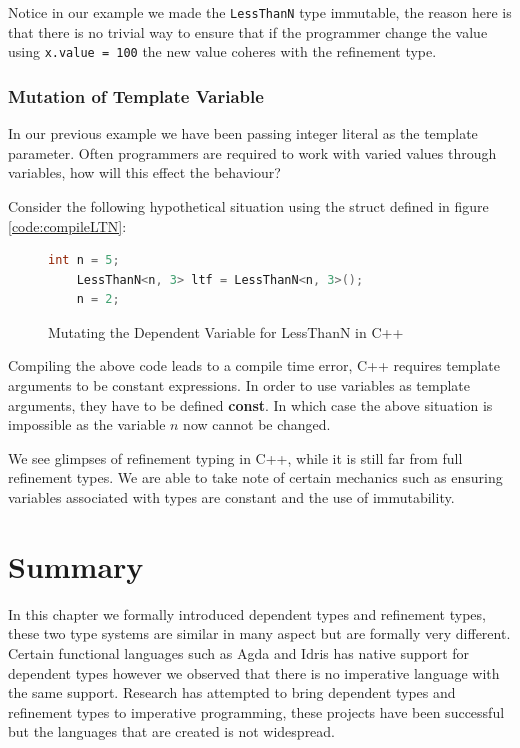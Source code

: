 \documentclass[a4paper,12pt]{report}
\begin{document}
\par
Notice in our example we made the \verb|LessThanN| type immutable, the reason 
here is that there is no trivial way to ensure that if the programmer change the 
value using \verb|x.value = 100| the new value coheres with the refinement 
type.

\subsubsection{Mutation of Template Variable}
In our previous example we have been passing integer literal as the template 
parameter. Often programmers are required to 
work with varied values through variables, how will this effect the behaviour? 

\par
Consider the following hypothetical situation using the struct defined in 
figure \ref{code:compileLTN}: 

\begin{figure}[H]
  \begin{lstlisting}[language=c++]     
    int n = 5;
    LessThanN<n, 3> ltf = LessThanN<n, 3>();
    n = 2;
  \end{lstlisting}
  \caption{Mutating the Dependent Variable for LessThanN in C++}
\end{figure}

\par
Compiling the above code leads to a compile time error, C++ requires template 
arguments to be constant expressions. In order to use variables as template 
arguments, they have to be defined \textbf{const}. In which case the above 
situation is impossible as the variable $n$ now cannot be changed. 

\par
We see glimpses of refinement typing in C++, while it is still far from full 
refinement types. We are able to take note of certain mechanics such as ensuring 
variables associated with types are constant and the use of immutability. 

\section{Summary}
In this chapter we formally introduced dependent types and refinement types, 
these two type systems are similar in many aspect but are formally very 
different. Certain functional languages such as Agda and Idris has native support for 
dependent types however we observed that there is no imperative language with 
the same support. Research has attempted to bring dependent types and refinement types 
to imperative programming, these projects have been successful but the languages 
that are created is not widespread. 
\end{document}
